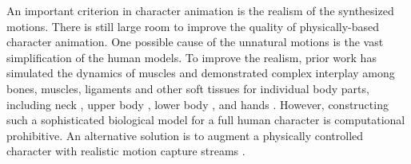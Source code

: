 An important criterion in character animation is the realism of the synthesized motions. There is still large room to improve the quality of physically-based character animation. One possible cause of the unnatural motions is the vast simplification of the human models. To improve the realism, prior work has simulated the dynamics of muscles and demonstrated complex interplay among bones, muscles, ligaments and other soft tissues for individual body parts, including
neck \cite{Lee:2006}, upper body \cite{Zordan:2006,Dilorenzo:2008,Lee:2009:CBM}, lower body \cite{Wang:2012}, and hands
\cite{Tsang:2005,Sueda:2008}. However, constructing such a sophisticated biological model for a full human character is computational prohibitive. An alternative solution is to augment a physically controlled character with realistic motion capture streams \cite{daSilva:2008,Muico:2009,Liu:2010}. 














